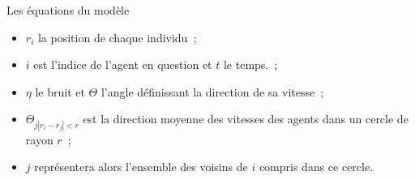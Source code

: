 \documentclass[aspectratio=43, a4paper, 12pt]{beamer}
\begin{document}
\begin{frame}{Les équations du modèle}

		\begin{itemize}
				   \item<1-3> $r_{i}$ la position de chaque individu~;
				   \item<2-3> $i$ est l'indice de l'agent en question et $t$ le temps.~;
					\item<3-3> $\eta$ le bruit et $\Theta$ l’angle définissant la direction de sa vitesse~;
		\end{itemize}
				
		\vspace{-2cm} 
		\begin{itemize}
				   \item<4-> $\Theta_{j |r_{i}-r_{j}|<r}$ est la direction moyenne des vitesses des agents dans un cercle de rayon $r$~;
					\item<5->  $j$ représentera alors l'ensemble des voisins de $i$ compris dans ce cercle.		
					
		\end{itemize}
	\end{frame}
	
\end{document}
